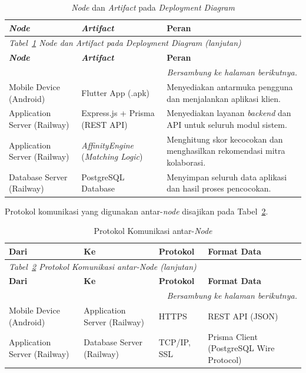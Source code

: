 \begin{longtable}{p{4cm} p{4cm} >{\raggedright\arraybackslash}p{\dimexpr\linewidth-8cm-6\tabcolsep\relax}}
  \caption{\emph{Node} dan \emph{Artifact} pada \emph{Deployment Diagram}}
  \label{tab:deployment-nodes} \\
  \toprule
    \textbf{\emph{Node}} & \textbf{\emph{Artifact}} & \textbf{Peran} \\
  \midrule
  \endfirsthead
  \multicolumn{3}{l}{\small\textit{Tabel~\ref{tab:deployment-nodes} \emph{Node} dan \emph{Artifact} pada \emph{Deployment Diagram} (lanjutan)}} \\
  \toprule
    \textbf{\emph{Node}} & \textbf{\emph{Artifact}} & \textbf{Peran} \\
  \midrule
  \endhead
  \bottomrule
  \multicolumn{3}{r}{\textit{Bersambung ke halaman berikutnya.}} \\
  \endfoot
  \bottomrule
  \endlastfoot
    Mobile Device (Android) & Flutter App (.apk) & Menyediakan antarmuka pengguna dan menjalankan aplikasi klien. \\
    \midrule
    Application Server (Railway) & Express.js + Prisma (REST API) & Menyediakan layanan \emph{backend} dan API untuk seluruh modul sistem. \\
    \midrule
    Application Server (Railway) & \emph{AffinityEngine} (\emph{Matching Logic}) & Menghitung skor kecocokan dan menghasilkan rekomendasi mitra kolaborasi. \\
    \midrule
    Database Server (Railway) & PostgreSQL Database & Menyimpan seluruh data aplikasi dan hasil proses pencocokan. \\
\end{longtable}

Protokol komunikasi yang digunakan antar-\emph{node} disajikan pada Tabel~\ref{tab:deployment-protocols}.

\begin{longtable}{p{3.5cm} p{3.5cm} p{2cm} >{\raggedright\arraybackslash}p{\dimexpr\linewidth-9cm-8\tabcolsep\relax}}
  \caption{Protokol Komunikasi antar-\emph{Node}}
  \label{tab:deployment-protocols} \\
  \toprule
    \textbf{Dari} & \textbf{Ke} & \textbf{Protokol} & \textbf{Format Data} \\
  \midrule
  \endfirsthead
  \multicolumn{4}{l}{\small\textit{Tabel~\ref{tab:deployment-protocols} Protokol Komunikasi antar-\emph{Node} (lanjutan)}} \\
  \toprule
    \textbf{Dari} & \textbf{Ke} & \textbf{Protokol} & \textbf{Format Data} \\
  \midrule
  \endhead
  \bottomrule
  \multicolumn{4}{r}{\textit{Bersambung ke halaman berikutnya.}} \\
  \endfoot
  \bottomrule
  \endlastfoot
    Mobile Device (Android) & Application Server (Railway) & HTTPS & REST API (JSON) \\
    \midrule
    Application Server (Railway) & Database Server (Railway) & TCP/IP, SSL & Prisma Client (PostgreSQL Wire Protocol) \\
\end{longtable}

